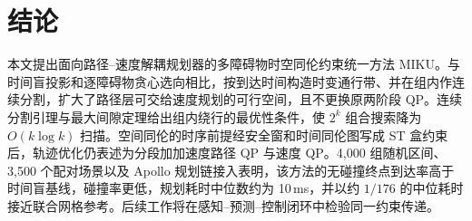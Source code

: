 \documentclass[a4paper,zihao=5]{ctexart}
\theoremstyle{definition}
\begin{document}
\section{结论}
\label{sec:conclusion}

本文提出面向路径--速度解耦规划器的多障碍物时空同伦约束统一方法 MIKU。与时间盲投影和逐障碍物贪心选向相比，按到达时间构造时变通行带、并在组内作连续分割，扩大了路径层可交给速度规划的可行空间，且不更换原两阶段 QP。连续分割引理与最大间隙定理给出组内绕行的最优性条件，使 $2^k$ 组合搜索降为 $O(k\log k)$ 扫描。空间同伦的时序前提经安全窗和时间同伦图写成 ST 盒约束后，轨迹优化仍表述为分段加加速度路径 QP 与速度 QP。4,000 组随机区间、3,500 个配对场景以及 Apollo 规划链接入表明，该方法的无碰撞终点到达率高于时间盲基线，碰撞率更低，规划耗时中位数约为 10\,ms，并以约 $1/176$ 的中位耗时接近联合网格参考。后续工作将在感知--预测--控制闭环中检验同一约束传递。

\printbibliography[heading=bibintoc,title={参考文献}]
\end{document}
